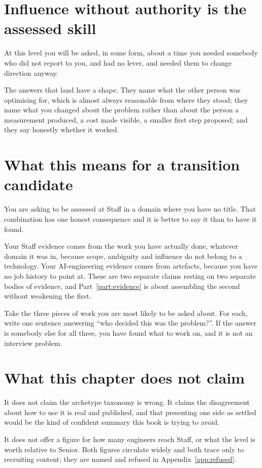 \section{Influence without authority is the assessed skill}

At this level you will be asked, in some form, about a time you needed somebody
who did not report to you, and had no lever, and needed them to change
direction anyway.

The answers that land have a shape. They name what the other person was
optimising for, which is almost always reasonable from where they stood; they
name what you changed about the problem rather than about the person \dash{} a
measurement produced, a cost made visible, a smaller first step proposed; and
they say honestly whether it worked. 

\section{What this means for a transition candidate}

You are asking to be assessed at Staff in a domain where you have no title.
That combination has one honest consequence and it is better to say it than to
have it found.

Your Staff evidence comes from the work you have actually done, whatever domain
it was in, because scope, ambiguity and influence do not belong to a
technology. Your AI-engineering evidence comes from artefacts, because you have
no job history to point at. These are two separate claims resting on two
separate bodies of evidence, and Part~\ref{part:evidence} is about assembling
the second without weakening the first.

\begin{drill}
Take the three pieces of work you are most likely to be asked about. For each,
write one sentence answering ``who decided this was the problem?''. If the
answer is somebody else for all three, you have found what to work on, and it
is not an interview problem.
\end{drill}

\section*{What this chapter does not claim}

It does not claim the archetype taxonomy is wrong. It claims the disagreement
about how to use it is real and published, and that presenting one side as
settled would be the kind of confident summary this book is trying to avoid.

It does not offer a figure for how many engineers reach Staff, or what the level
is worth relative to Senior. Both figures circulate widely and both trace only
to recruiting content; they are named and refused in Appendix~\ref{app:refused}.
